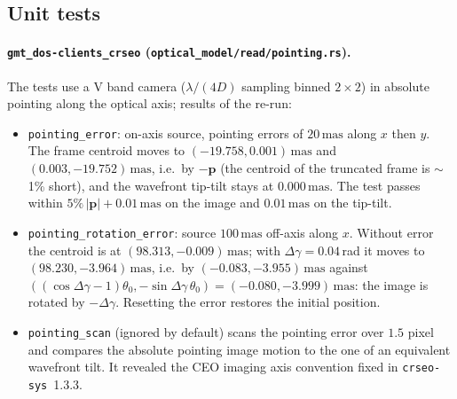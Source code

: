 \documentclass{gmto}
\numberwithin{table}{section}
\numberwithin{equation}{section}
\newcommand{\code}[1]{\texttt{#1}}
\newcommand{\mas}{\,\mathrm{mas}}
\newcommand{\vect}[1]{\boldsymbol{#1}}
\begin{document}
\subsection{Unit tests}
\label{sec:ver-unit}

\paragraph{\code{gmt\_dos-clients\_crseo} (\code{optical\_model/read/pointing.rs}).}
The tests use a V band camera ($\lambda/(4D)$ sampling binned $2\times2$) in absolute pointing along
the optical axis; results of the re-run:
\begin{itemize}
\item \code{pointing\_error}: on-axis source, pointing errors of $20\mas$ along $x$ then $y$. The frame
  centroid moves to $(-19.758, 0.001)\mas$ and $(0.003, -19.752)\mas$, i.e.\ by $-\vect{p}$ (the
  centroid of the truncated frame is $\sim$1\% short), and the wavefront tip-tilt stays at
  $0.000\mas$. The test passes within $5\%\,|\vect{p}| + 0.01\mas$ on the image and $0.01\mas$ on the
  tip-tilt.
\item \code{pointing\_rotation\_error}: source $100\mas$ off-axis along $x$. Without error the centroid
  is at $(98.313, -0.009)\mas$; with $\Delta\gamma = 0.04$\,rad it moves to $(98.230, -3.964)\mas$,
  i.e.\ by $(-0.083, -3.955)\mas$ against $((\cos\Delta\gamma - 1)\theta_0, -\sin\Delta\gamma\,\theta_0)
  = (-0.080, -3.999)\mas$: the image is rotated by $-\Delta\gamma$. Resetting the error restores the
  initial position.
\item \code{pointing\_scan} (ignored by default) scans the pointing error over $1.5$ pixel and compares
  the absolute pointing image motion to the one of an equivalent wavefront tilt. It revealed the CEO
  imaging axis convention fixed in \code{crseo-sys}~1.3.3.
\end{itemize}
\end{document}
